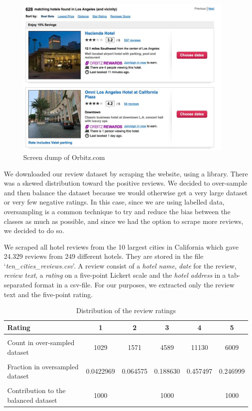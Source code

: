 \documentclass{article}
\begin{document}
\begin{figure}[!ht]
	\centering
		\includegraphics[height=8cm]{orbits}
	\caption{Screen dump of Orbitz.com}
	\label{fig:orbitz}
\end{figure}

We downloaded our review dataset by scraping the website, using a library\cite{web:hotelscrape}. There was a skewed distribution toward the positive reviews. We decided to over-sample and then balance the dataset because we would otherwise get a very large dataset or very few negative ratings. In this case, since we are using labelled data, oversampling is a common technique to try and reduce the bias between the classes as much as possible, and since we had the option to scrape more reviews, we decided to do so. 

We scraped all hotel reviews from the 10 largest cities in California which gave 24.329 reviews from 249 different hotels. They are stored in the file `\textit{ten\_cities\_reviews.csv}'. A review consist of a \textit{hotel name}, \textit{date} for the review, \textit{review text}, a \textit{rating} on a five-point Lickert scale and the \textit{hotel address} in a tab-separated format in a csv-file. For our purposes, we extracted only the review text and the five-point rating. 

\begin{table}[ht!]
  \centering
  \begin{tabular}{ p{25mm} | c | c | c | c | c |}
   
Rating & 1 & 2 & 3 & 4 & 5 \\ \hline\hline&&&&&\\
Count in over-sampled dataset & 1029  &1571& 4589& 11130& 6009\\
&&&&&\\Fraction in oversampled dataset&0.0422969& 0.064575&0.188630& 0.457497&0.246999\\
&&&&&\\Contribution to the balanced dataset&1000&&1000&&1000\\
\hline
  \end{tabular}
  \caption{Distribution of the review ratings}
  \label{tab:ratingstab}
\end{table}
\end{document}
